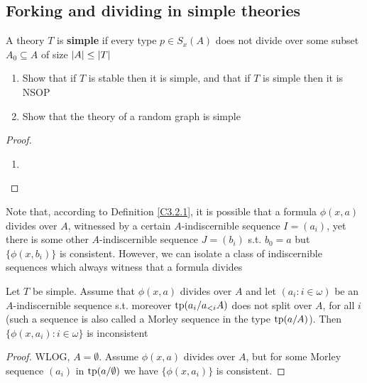 \documentclass[11pt]{article}
\begin{document}
\subsection{Forking and dividing in simple theories}
\label{sec:org53d097d}
\begin{definition}[]
A theory \(T\) is \textbf{simple} if every type \(p\in S_x(A)\) does not divide over some
subset \(A_0\subseteq A\) of size \(\abs{A}\le\abs{T}\)
\end{definition}

\begin{exercise}
\label{Problem10}
\begin{enumerate}
\item Show that if \(T\) is stable then it is simple, and that if \(T\) is simple then it is NSOP
\item Show that the theory of a random graph is simple
\end{enumerate}
\end{exercise}

\begin{proof}
\begin{enumerate}
\item 
\end{enumerate}
\end{proof}

Note that, according to Definition \ref{C3.2.1}, it is possible that a formula \(\phi(x,a)\) divides
over \(A\), witnessed by a certain \(A\)-indiscernible sequence \(I=(a_i)\), yet there is some
other \(A\)-indiscernible sequence \(J=(b_i)\) s.t. \(b_0=a\) but \(\{\phi(x,b_i)\}\) is consistent.
However, we can isolate a class of indiscernible sequences which always witness that a formula
divides

\begin{lemma}
Let \(T\) be simple. Assume that \(\phi(x,a)\) divides over \(A\) and let \((a_i:i\in\omega)\) be
an \(A\)-indiscernible sequence s.t. moreover \(\operatorname{tp}(a_i/a_{<i}A)\) does not split over \(A\), for
all \(i\) (such a sequence is also called a Morley sequence in the type \(\operatorname{tp}(a/A)\)).
Then \(\{\phi(x,a_i):i\in\omega\}\) is inconsistent
\end{lemma}

\begin{proof}
WLOG, \(A=\emptyset\). Assume \(\phi(x,a)\) divides over \(A\), but for some Morley sequence \((a_i)\)
in \(\operatorname{tp}(a/\emptyset)\) we have \(\{\phi(x,a_i)\}\) is consistent.
\end{proof}
\end{document}
